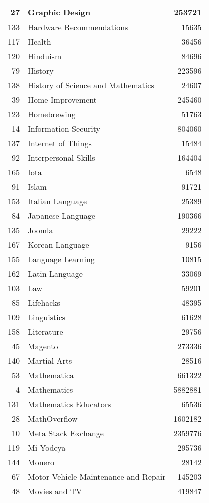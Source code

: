 \documentclass[]{book}
\theoremstyle{definition}
\theoremstyle{definition}
\theoremstyle{definition}
\theoremstyle{remark}
\begin{document}
\begin{tabular}{r|l|r}
\hline
27 & Graphic Design & 253721\\
\hline
133 & Hardware Recommendations & 15635\\
\hline
117 & Health & 36456\\
\hline
120 & Hinduism & 84696\\
\hline
79 & History & 223596\\
\hline
138 & History of Science and Mathematics & 24607\\
\hline
39 & Home Improvement & 245460\\
\hline
123 & Homebrewing & 51763\\
\hline
14 & Information Security & 804060\\
\hline
137 & Internet of Things & 15484\\
\hline
92 & Interpersonal Skills & 164404\\
\hline
165 & Iota & 6548\\
\hline
91 & Islam & 91721\\
\hline
153 & Italian Language & 25389\\
\hline
84 & Japanese Language & 190366\\
\hline
135 & Joomla & 29222\\
\hline
167 & Korean Language & 9156\\
\hline
155 & Language Learning & 10815\\
\hline
162 & Latin Language & 33069\\
\hline
103 & Law & 59201\\
\hline
85 & Lifehacks & 48395\\
\hline
109 & Linguistics & 61628\\
\hline
158 & Literature & 29756\\
\hline
45 & Magento & 273336\\
\hline
140 & Martial Arts & 28516\\
\hline
53 & Mathematica & 661322\\
\hline
4 & Mathematics & 5882881\\
\hline
131 & Mathematics Educators & 65536\\
\hline
28 & MathOverflow & 1602182\\
\hline
10 & Meta Stack Exchange & 2359776\\
\hline
119 & Mi Yodeya & 295736\\
\hline
144 & Monero & 28142\\
\hline
67 & Motor Vehicle Maintenance and Repair & 145203\\
\hline
48 & Movies and TV & 419847\\

\end{tabular}
\end{document}
